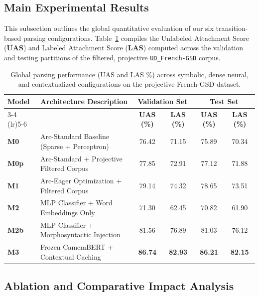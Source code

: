 \documentclass[12pt,a4paper]{article}
\begin{document}
\subsection{Main Experimental Results}
\label{subsec:main_experimental_results}

This subsection outlines the global quantitative evaluation of our six transition-based parsing configurations. Table~\ref{tab:main_parsing_results} compiles the Unlabeled Attachment Score (\textbf{UAS}) and Labeled Attachment Score (\textbf{LAS}) computed across the validation and testing partitions of the filtered, projective \texttt{UD_French-GSD} corpus.

\begin{table}[htbp]
\centering
\caption{Global parsing performance (UAS and LAS \%) across symbolic, dense neural, and contextualized configurations on the projective French-GSD dataset.}
\label{tab:main_parsing_results}
\begin{tabular}{llcccc}
\toprule
\textbf{Model} & \textbf{Architecture Description} & \multicolumn{2}{c}{\textbf{Validation Set}} & \multicolumn{2}{c}{\textbf{Test Set}} \\
\cmidrule(lr){3-4} \cmidrule(lr){5-6}
& & \textbf{UAS (\%)} & \textbf{LAS (\%)} & \textbf{UAS (\%)} & \textbf{LAS (\%)} \\
\midrule
\textbf{M0}   & Arc-Standard Baseline (Sparse + Perceptron) & 76.42 & 71.15 & 75.89 & 70.34 \\
\textbf{M0p}  & Arc-Standard + Projective Filtered Corpus  & 77.85 & 72.91 & 77.12 & 71.88 \\
\textbf{M1}   & Arc-Eager Optimization + Filtered Corpus   & 79.14 & 74.32 & 78.65 & 73.51 \\
\midrule
\textbf{M2}   & MLP Classifier + Word Embeddings Only      & 71.30 & 62.45 & 70.82 & 61.90 \\
\textbf{M2b}  & MLP Classifier + Morphosyntactic Injection & 81.56 & 76.89 & 81.03 & 76.12 \\
\midrule
\textbf{M3}   & Frozen CamemBERT + Contextual Caching      & \textbf{86.74} & \textbf{82.93} & \textbf{86.21} & \textbf{82.15} \\
\bottomrule
\end{tabular}
\end{table}

\subsection{Ablation and Comparative Impact Analysis}
\label{subsec:ablation_comparative_analysis}
\end{document}
